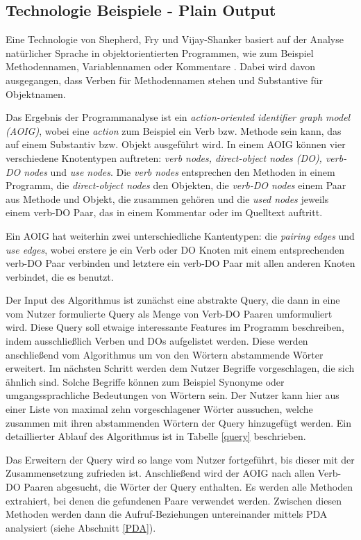 \documentclass[runningheads,a4paper]{llncs}
\begin{document}
\subsection*{Technologie Beispiele - Plain Output}

Eine Technologie von Shepherd, Fry und Vijay-Shanker basiert auf der Analyse natürlicher Sprache in objektorientierten Programmen, wie zum Beispiel Methodennamen, Variablennamen oder Kommentare \cite{shepherd}. Dabei wird davon ausgegangen, dass Verben für Methodennamen stehen und Substantive für Objektnamen.

Das Ergebnis der Programmanalyse ist ein \textit{action-oriented identifier graph model (AOIG)}, wobei eine \textit{action} zum Beispiel ein Verb bzw. Methode sein kann, das auf einem Substantiv bzw. Objekt ausgeführt wird. In einem AOIG können vier verschiedene Knotentypen auftreten: \textit{verb nodes, direct-object nodes (DO), verb-DO nodes} und \textit{use nodes}. Die \textit{verb nodes} entsprechen den Methoden in einem Programm, die \textit{direct-object nodes} den Objekten, die \textit{verb-DO nodes} einem Paar aus Methode und Objekt, die zusammen gehören und die \textit{used nodes} jeweils einem verb-DO Paar, das in einem Kommentar oder im Quelltext auftritt.

Ein AOIG hat weiterhin zwei unterschiedliche Kantentypen: die \textit{pairing edges} und \textit{use edges}, wobei erstere je ein Verb oder DO Knoten mit einem entsprechenden verb-DO Paar verbinden und letztere ein verb-DO Paar mit allen anderen Knoten verbindet, die es benutzt.

Der Input des Algorithmus ist zunächst eine abstrakte Query, die dann in eine vom Nutzer formulierte Query als Menge von Verb-DO Paaren umformuliert wird. Diese Query soll etwaige interessante Features im Programm beschreiben, indem ausschließlich Verben und DOs aufgelistet werden. Diese werden anschließend vom Algorithmus um von den Wörtern abstammende Wörter erweitert. Im nächsten Schritt werden dem Nutzer Begriffe vorgeschlagen, die sich ähnlich sind. Solche Begriffe können zum Beispiel Synonyme oder umgangssprachliche Bedeutungen von Wörtern sein. Der Nutzer kann hier aus einer Liste von maximal zehn vorgeschlagener Wörter aussuchen, welche zusammen mit ihren abstammenden Wörtern der Query hinzugefügt werden. Ein detaillierter Ablauf des Algorithmus ist in Tabelle \ref{query} beschrieben.

Das Erweitern der Query wird so lange vom Nutzer fortgeführt, bis dieser mit der Zusammensetzung zufrieden ist. Anschließend wird der AOIG nach allen Verb-DO Paaren abgesucht, die Wörter der Query enthalten. Es werden alle Methoden extrahiert, bei denen die gefundenen Paare verwendet werden. Zwischen diesen Methoden werden dann die Aufruf-Beziehungen untereinander mittels PDA analysiert (siehe Abschnitt \ref{PDA}).
\end{document}
